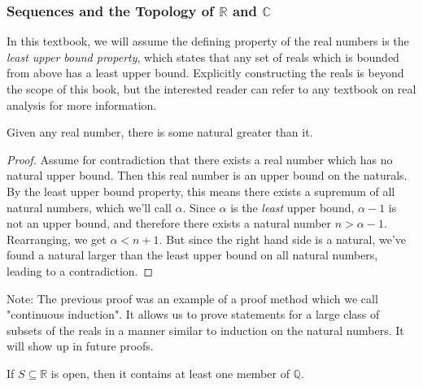 \subsubsection{Sequences and the Topology of $\mathbb{R}$ and $\mathbb{C}$}
In this textbook, we will assume the defining property of the real numbers is the \emph{least upper bound property}, which states that any set of reals which is bounded from above has a least upper bound. Explicitly constructing the reals is beyond the scope of this book, but the interested reader can refer to any textbook on real analysis for more information.
\begin{lemma}
Given any real number, there is some natural greater than it.
\end{lemma}
\begin{proof}
Assume for contradiction that there exists a real number which has no natural upper bound. Then this real number is an upper bound on the naturals. By the least upper bound property, this means there exists a supremum of all natural numbers, which we'll call $\alpha$. Since $\alpha$ is the \emph{least} upper bound, $\alpha -1$ is not an upper bound, and therefore there exists a natural number $n > \alpha -1$. Rearranging, we get $\alpha < n+1$. But since the right hand side is a natural, we've found a natural larger than the least upper bound on all natural numbers, leading to a contradiction.
\end{proof}
Note: The previous proof was an example of a proof method which we call "continuous induction". It allows us to prove statements for a large class of subsets of the reals in a manner similar to induction on the natural numbers. It will show up in future proofs.
\begin{theorem}
If $S \subseteq \mathbb{R}$ is open, then it contains at least one member of $\mathbb{Q}$.
\end{theorem}
